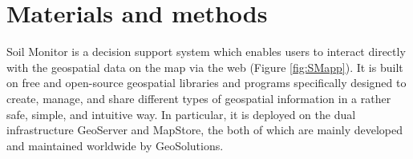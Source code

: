 \documentclass[APA,LATO1COL,doublespace]{WileyNJD-v2}
\begin{document}
\section{Materials and methods} \label{sec:MatMet}
Soil Monitor is a decision support system which enables users to interact directly with the geospatial data on the map via the web (Figure \ref{fig:SMapp}).
It is built on free and open-source geospatial libraries and programs specifically designed to create, manage, and share different types of geospatial information in a rather safe, simple, and intuitive way.
In particular, it is deployed on the dual infrastructure GeoServer and MapStore, the both of which are mainly developed and maintained worldwide by GeoSolutions.
\end{document}
